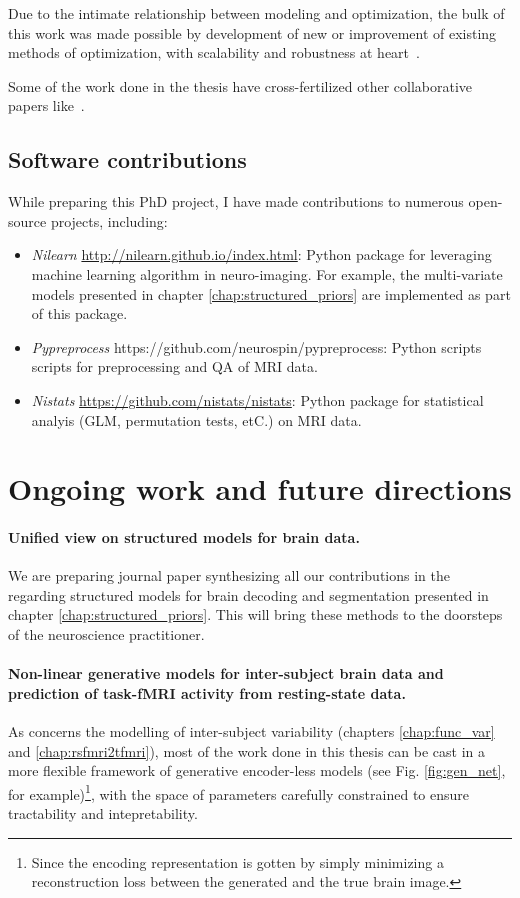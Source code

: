 Due to the intimate relationship between modeling and optimization, the
bulk of this work was made possible by development of new or improvement of existing methods of
optimization, with scalability and robustness at heart~\citep{dohmatob2014benchmarking,dohmatob2015local,varoquaux2015faasta,dohmatob2015simple}.

Some of the work done in the thesis have cross-fertilized other collaborative papers like~\citep{rahim2015integrating,thirion2014fmri}.

\subsection{Software contributions}
While preparing this PhD project, I have made contributions to numerous open-source projects, including:
\begin{itemize}
\item \textit{Nilearn} \url{http://nilearn.github.io/index.html}: Python package for leveraging machine learning algorithm in neuro-imaging. For example, the multi-variate models presented in chapter \ref{chap:structured_priors} are implemented as part of this package.
\item \textit{Pypreprocess} https://github.com/neurospin/pypreprocess: Python scripts scripts for preprocessing and QA of MRI data.
\item \textit{Nistats} \url{https://github.com/nistats/nistats}: Python package for statistical analyis (GLM, permutation tests, etC.) on MRI data.
\end{itemize}
    

\section{Ongoing work and future directions}
\paragraph{Unified view on structured models for brain data.}
We are preparing journal paper synthesizing all our contributions in the regarding structured models for brain decoding and segmentation presented in chapter \ref{chap:structured_priors}. This will bring these methods to the doorsteps of the neuroscience practitioner.
\paragraph{Non-linear generative models for inter-subject brain data and prediction of task-fMRI activity from resting-state data.}
As concerns the modelling of inter-subject variability (chapters \ref{chap:func_var} and \ref{chap:rsfmri2tfmri}), most of the work done in this thesis can be cast in a more flexible framework of generative encoder-less models (see Fig. \ref{fig:gen_net}, for example)\footnote{Since the encoding representation is gotten by simply minimizing a reconstruction loss between the generated and the true brain image.}, with the space of parameters carefully constrained to ensure tractability and intepretability.
  


